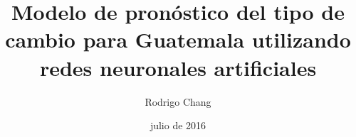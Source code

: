 \title{Modelo de pronóstico del tipo de cambio para Guatemala utilizando redes neuronales artificiales}
\author{Rodrigo Chang}
\date{julio de 2016}

\thispagestyle{empty}
\noindent
\maketitle

